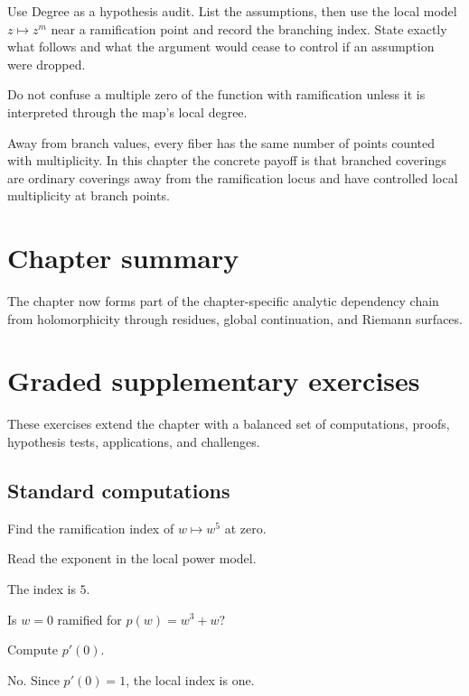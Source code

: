 \begin{exercise}\label{exr:iv24-08}
Use Degree as a hypothesis audit. List the assumptions, then use the local model \(z\mapsto z^m\) near a ramification point and record the branching index. State exactly what follows and what the argument would cease to control if an assumption were dropped.
\end{exercise}
\begin{hint}
Do not confuse a multiple zero of the function with ramification unless it is interpreted through the map's local degree.
\end{hint}
\begin{solution}
Away from branch values, every fiber has the same number of points counted with multiplicity. In this chapter the concrete payoff is that branched coverings are ordinary coverings away from the ramification locus and have controlled local multiplicity at branch points.
\end{solution}

\section*{Chapter summary}
The chapter now forms part of the chapter-specific analytic dependency chain from holomorphicity through residues, global continuation, and Riemann surfaces.
\section{Graded supplementary exercises}
These exercises extend the chapter with a balanced set of computations, proofs, hypothesis tests, applications, and challenges.

\subsection*{Standard computations}

\begin{exercise}\label{exr:iv24-expand-01}
Find the ramification index of \(w\mapsto w^5\) at zero.
\end{exercise}
\begin{hint}
Read the exponent in the local power model.
\end{hint}
\begin{solution}
The index is \(5\).
\end{solution}

\begin{exercise}\label{exr:iv24-expand-02}
Is \(w=0\) ramified for \(p(w)=w^3+w\)?
\end{exercise}
\begin{hint}
Compute \(p'(0)\).
\end{hint}
\begin{solution}
No. Since \(p'(0)=1\), the local index is one.
\end{solution}

